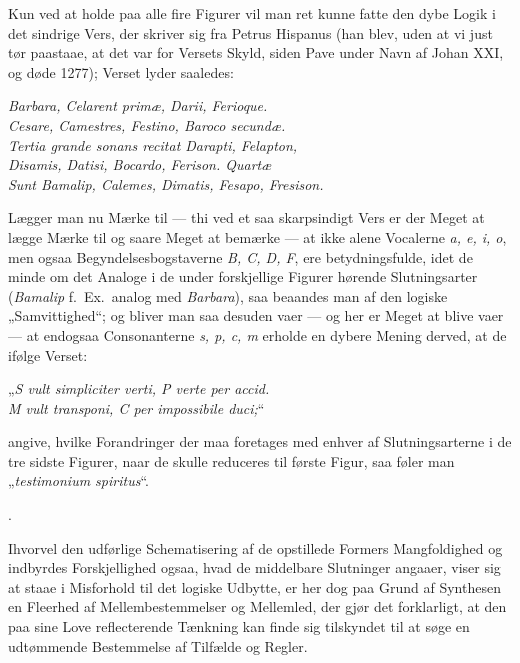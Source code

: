 \documentclass[12pt]{book}
\newcommand{\opage}[1]{\marginnote{\footnotesize\textit{[#1]}}}
\begin{document}
{Kun ved at holde paa alle fire Figurer vil man ret kunne fatte den dybe Logik i det sindrige Vers, der skriver sig fra Petrus Hispanus (han blev, uden at vi just tør paastaae, at det var for Versets Skyld, siden Pave under Navn af Johan XXI, og døde 1277); Verset lyder saaledes:
\par\medskip
\hspace*{2em}\textit{Barbara, Celarent primæ, Darii, Ferioque.}\\
\hspace*{2em}\textit{Cesare, Camestres, Festino, Baroco secundæ.}\\
\hspace*{2em}\textit{Tertia grande sonans recitat Darapti, Felapton,}\\
\hspace*{2em}\textit{Disamis, Datisi, Bocardo, Ferison. Quartæ}\\
\hspace*{2em}\textit{Sunt Bamalip, Calemes, Dimatis, Fesapo, Fresison.}
\par\medskip\noindent
Lægger man nu Mærke til --- thi ved et saa skarpsindigt Vers er der Meget at lægge Mærke til og saare Meget at bemærke --- at ikke alene Vocalerne \textit{a, e, i, o}, men ogsaa Begyndelsesbogstaverne \textit{B, C, D, F}, ere betydningsfulde, idet de minde om det Analoge %
i de under forskjellige Figurer hørende Slutningsarter (\textit{Bamalip} f.\ Ex.\ analog med \textit{Barbara}), saa beaandes man af den logiske „Samvittighed“; og bliver man saa desuden vaer --- og her er Meget at blive vaer --- at endogsaa Consonanterne \textit{s, p, c, m} erholde en dybere Mening derved, at de ifølge Verset:
\par\medskip
\hspace*{2em}„\textit{S vult simpliciter verti, P verte per accid.}\\
\hspace*{2em}\textit{M vult transponi, C per impossibile duci;}“
\par\medskip\noindent
angive, hvilke Forandringer der maa foretages med enhver af Slutningsarterne i de tre sidste Figurer, naar de skulle reduceres til første Figur, saa føler man „\textit{testimonium spiritus}“.}%
.

\opage{317}Ihvorvel den udførlige Schematisering af de opstillede Formers Mangfoldighed og indbyrdes Forskjellighed ogsaa,
\opage{318}hvad de middelbare Slutninger angaaer, viser sig at staae i Misforhold til det logiske Udbytte, er her dog paa Grund af Synthesen en Fleerhed af Mellembestemmelser og Mellemled, der gjør det forklarligt, at den paa sine Love reflecterende Tænkning kan finde sig tilskyndet til at søge en udtømmende Bestemmelse af Tilfælde og Regler.
\end{document}
